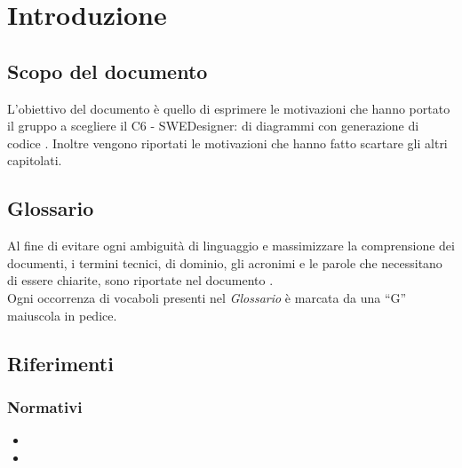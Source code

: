 \documentclass[../StudiodiFattibilita.tex]{subfiles}
\begin{document}
	\section{Introduzione}
		\subsection{Scopo del documento}
			L'obiettivo del documento è quello di esprimere le motivazioni che hanno portato il gruppo a scegliere il  C6 - SWEDesigner:  di diagrammi  con generazione di codice .
			Inoltre vengono riportati le motivazioni che hanno fatto scartare gli altri capitolati.
		\subsection{Glossario}
			Al fine di evitare ogni ambiguità di linguaggio e massimizzare la
			comprensione dei documenti, i termini tecnici, di dominio, gli
			acronimi e le parole che necessitano di essere chiarite, sono
			riportate nel documento \glossariov.\\
			Ogni occorrenza di vocaboli presenti nel \textit{Glossario} è
			marcata da una ``G'' maiuscola in pedice.
		\subsection{Riferimenti}
			\subsubsection{Normativi}
			\begin{itemize}
				\item \normediprogettoi
				\item \glossarioi
			\end{itemize}
\end{document}
